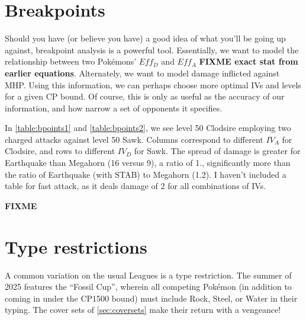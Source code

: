 \section{Breakpoints\label{sec:breakpoints}}
Should you have (or believe you have) a good idea of what you'll be going up against,
 breakpoint analysis is a powerful tool.
Essentially, we want to model the relationship between two Pokémons' $Eff_D$
 and $Eff_A$ \textbf{FIXME exact stat from earlier equations}.
Alternately, we want to model damage inflicted against MHP.
Using this information, we can perhaps choose more optimal IVs and levels for a given CP bound.
Of course, this is only as useful as the accuracy of our information, and how narrow a set of opponents it specifies.

In \autoref{table:bpoints1} and \autoref{table:bpoints2}, we see level 50 Clodsire
  employing two charged attacks against level 50 Sawk.
Columns correspond to different $IV_A$ for Clodsire, and rows to different $IV_D$ for Sawk.
The spread of damage is greater for Earthquake than Megahorn (16 versus 9), a ratio
  of 1., significantly more than the ratio of Earthquake (with STAB)
  to Megahorn (1.2).
I haven't included a table for fast attack, as it deals damage of 2 for all combinations of IVs.

\textbf{FIXME}


\section{Type restrictions\label{sec:typeleagues}}
A common variation on the usual Leagues is a type restriction.
The summer of 2025 features the ``Fossil Cup'', wherein all competing
  Pokémon (in addition to coming in under the CP1500 bound)
  must include Rock, Steel, or Water in their typing.
The cover sets of \autoref{sec:coversets} make their return with a vengeance!

